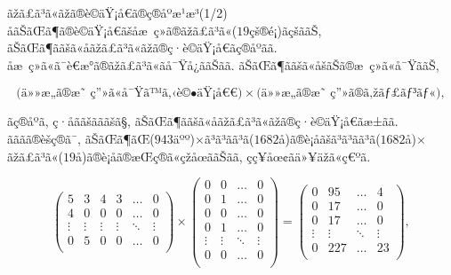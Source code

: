 \documentclass[dvipdfmx]{beamer} %
\begin{document}
\begin{frame}{ãžã£ã³ã«ãžã®è©äŸ¡å€ã®ç®åºæ¹æ³(1/2)}
åãŠãŒã¶ã®è©äŸ¡å€ãšåæ ç»ã®ãžã£ã³ã«($19$çš®é¡)ãçšããŠ, ãŠãŒã¶ããšã«åãžã£ã³ã«ãžã®ç·è©äŸ¡å€ãç®åºãã. åæ ç»ã«ã¯è€æ°ã®ãžã£ã³ã«ãå¯Ÿå¿ããŠãã. ãŠãŒã¶ããšã«åšãŠã®æ ç»ã«å¯ŸããŠ, 

\begin{equation*}
\mbox{(ä»»æã®æ ç»ã«å¯Ÿããè©äŸ¡å€)} \times \mbox{(ä»»æã®æ ç»ã®ãžã£ã³ã«)},
\end{equation*}

\noindent
ãç®åºã, ç·åããšãããšã§, ãŠãŒã¶ããšã«åãžã£ã³ã«ãžã®ç·è©äŸ¡å€ãæ±ãã. ãããã®èšç®ã¯, ãŠãŒã¶ãŒ($943$äºº)$\times$ã³ã³ãã³ã($1682$å)ã®è¡åãšã³ã³ãã³ã($1682$å)$\times$ãžã£ã³ã«($19$å)ã®è¡åã®æŒç®ã«çžåœããŠãã, çç¥åœ¢ãä»¥äžã«ç€ºã. 

\footnotesize %
\begin{equation*}
\label{user_genre_matrix}
\begin{pmatrix} 
5 & 3 & 4 & 3 & \ldots & 0 \\
4 & 0 & 0 & 0 & \ldots & 0 \\
\vdots & \vdots & \vdots & \vdots & \ddots & \vdots \\
0 & 5 & 0 & 0 & \ldots & 0 \\
\end{pmatrix} 
\times
\begin{pmatrix} 
0 & 0 & \ldots & 0 \\
0 & 1 & \ldots & 0 \\
0 & 0 & \ldots & 0 \\
0 & 1 & \ldots & 0 \\
\vdots & \vdots & \ddots & \vdots \\
0 & 0 & \ldots & 0 \\
\end{pmatrix}
=
\begin{pmatrix} 
0 & 95 & \ldots & 4 \\
0 & 17 & \ldots & 0 \\
0 & 17 & \ldots & 0 \\
\vdots & \vdots & \ddots & \vdots \\
0 & 227 & \ldots & 23 \\
\end{pmatrix},
\end{equation*}
\normalsize

\end{frame}
\end{document}
